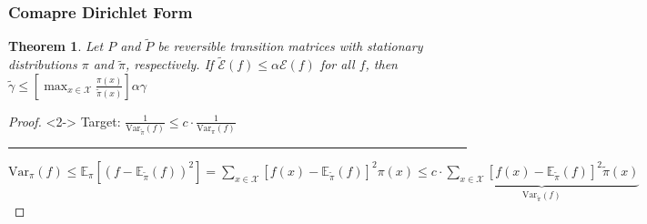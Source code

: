 \documentclass{beamer}
\newtheorem{thm}{Theorem}
\def\Var{\mathrm{Var}}
\def\E{\mathbb{E}}
\begin{document}
\begin{frame}
  \scriptsize
  \frametitle{Comapre Dirichlet Form}
  \begin{thm}
    Let $P$ and $\tilde{P}$ be reversible transition matrices with stationary distributions $\pi$ and $\tilde{\pi}$, respectively. If $\tilde{\mathcal{E}}(f) \leq \alpha\mathcal{E}(f)$ for all $f$, then\\
    \centering $\tilde{\gamma} \leq \left[\max_{x\in\mathcal{X}}\frac{\pi(x)}{\tilde{\pi}(x)}\right]\alpha\gamma$
  \end{thm}
  \begin{proof}<2->
    Target: $\frac{1}{\Var_{\tilde{\pi}}(f)} \leq c \cdot \frac{1}{\Var_\pi(f)}$ \\
    \vspace{1mm}
    \hrule
    \vspace{1mm}
    $\Var_\pi(f) \leq \E_\pi[(f - \E_{\tilde{\pi}}(f))^2]
    = \sum_{x\in\mathcal{X}}[f(x) - \E_{\tilde{\pi}}(f)]^2\pi(x)
    \leq c \cdot \underbrace{\sum_{x\in\mathcal{X}}[f(x) - \E_{\tilde{\pi}}(f)]^2\tilde{\pi}(x)}_{\Var_{\tilde{\pi}}(f)}
    $ \\
  \end{proof}
\end{frame}
\end{document}
